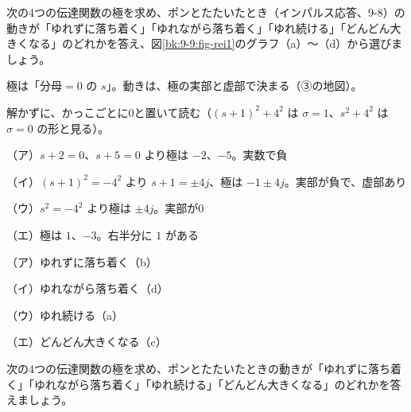 \begin{reidai}[極の場所から動きを当てる]
次の4つの伝達関数の極を求め、ポンとたたいたとき（インパルス応答、9-8）の動きが「ゆれずに落ち着く」「ゆれながら落ち着く」「ゆれ続ける」「どんどん大きくなる」のどれかを答え、図\ref{bk:9-9:fig-rei1}のグラフ（a）〜（d）から選びましょう。
\kangaekata {}\par
{}\enspace 極は「分母$=0$ の $s$」。動きは、極の実部と虚部で決まる（③の地図）。\par
{}\enspace 解かずに、かっこごとに0と置いて読む（$(s+1)^2+4^2$ は $\sigma=1$、$s^2+4^2$ は $\sigma=0$ の形と見る）。\par
\shiki\kixjs{}\zw{} （ア）$s+2=0$、$s+5=0$ より極は $-2$、$-5$。実数で負\par
\kixja （イ）$(s+1)^2=-4^2$ より $s+1=\pm4j$、極は $-1\pm4j$。実部が負で、虚部あり\par
\kixja （ウ）$s^2=-4^2$ より極は $\pm4j$。実部が0\par
\kixja （エ）極は $1$、$-3$。右半分に $1$ がある\par
\kotae\kixjs{}\zw{} （ア）ゆれずに落ち着く（b）\par
\kixja （イ）ゆれながら落ち着く（d）\par
\kixja （ウ）ゆれ続ける（a）\par
\kixja （エ）どんどん大きくなる（c）
\end{reidai}

\begin{jibun}
次の4つの伝達関数の極を求め、ポンとたたいたときの動きが「ゆれずに落ち着く」「ゆれながら落ち着く」「ゆれ続ける」「どんどん大きくなる」のどれかを答えましょう。
\end{jibun}


